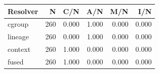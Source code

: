 \begin{tabular}{@{}lrrrrr@{}}
\toprule
Resolver & N & C/N & A/N & M/N & I/N \\
\midrule
cgroup & 260 & 0.000 & 1.000 & 0.000 & 0.000 \\
lineage & 260 & 0.000 & 1.000 & 0.000 & 0.000 \\
context & 260 & 1.000 & 0.000 & 0.000 & 0.000 \\
fused & 260 & 1.000 & 0.000 & 0.000 & 0.000 \\
\bottomrule
\end{tabular}
